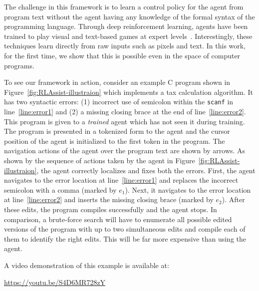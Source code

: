 \documentclass{article}
\newcommand{\code}[1]{\texttt{#1}}
\begin{document}
The challenge in this framework is to learn
a control policy for the agent from program text without
the agent having any knowledge of the formal syntax of the programming language.
Through deep reinforcement learning, agents have been trained to 
play visual and text-based games at expert 
levels~\cite{mnih2015human,narasimhan2015language,wu2016training}. Interestingly, these
techniques learn directly from raw inputs such as pixels and text.
In this work, for the first time, we show that
this is possible even in the space of computer programs.

To see our framework in action, consider an example C program shown in Figure~\ref{fig:RLAssist-illustraion} which implements a tax calculation algorithm.
It has two syntactic errors: (1) incorrect use of semicolon within the \code{scanf} in line~\ref{line:error1} and (2) a missing closing brace at the end of line~\ref{line:error2}.
This program is given to a \emph{trained} agent which has not seen it during training.
The program is presented in a tokenized form to the agent and
the cursor position of the agent is initialized to the first token in the program.
The navigation actions of the agent over the program text are shown by arrows.
As shown by the sequence of actions taken by the agent in Figure~\ref{fig:RLAssist-illustraion}, the agent correctly localizes and fixes both the errors.
First, the agent navigates to the error location at line~\ref{line:error1} and replaces the incorrect semicolon
with a comma (marked by {$e_1$}).
Next, it navigates to the error location at line~\ref{line:error2} and inserts the missing closing brace (marked by {$e_2$}).
After these edits, the program compiles successfully and the agent stops.
In comparison, a brute-force search will have to enumerate all possible
edited versions of the program with up to two simultaneous edits and compile each of them
to identify the right edits. This will be far more expensive than using
the agent.

A video demonstration of this example is available at:
\begin{center}
\url{https://youtu.be/S4D6MR728zY}
\end{center}
\end{document}
